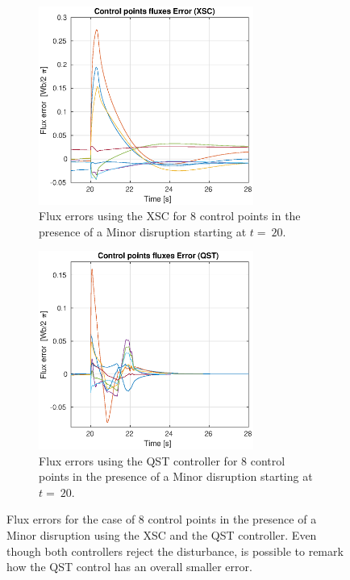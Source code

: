 \begin{figure}[h]
	\centering
	\begin{subfigure}[b]{0.4\textwidth}
		\includegraphics[trim={0cm 0cm 1.0cm 0cm},clip,height=6.50cm] {Chp3/Results_iso/8_gaps_fluxesError_mnr_dsrp.eps}  
		\caption{Flux errors using the XSC for 8 control points in the presence of a Minor disruption starting at $t=~20$.
			\label{FluxErrorXSC} }
	\end{subfigure}
	\hspace{2.2 cm }
	\begin{subfigure}[b]{0.4\textwidth}
		\includegraphics[trim={0cm 0cm 1.0cm 0cm},clip,height=6.50cm] {Chp3/Results_iso/8_gaps_fluxesError_mnr_dsrpFBC.eps}  
		\caption{ Flux errors using the QST controller for 8 control points in the presence of a Minor disruption starting  at $t=~20$.
			\label{FluxErroFBC} }
	\end{subfigure}
	
	\caption{Flux errors for the case of 8 control points in the presence of a Minor disruption using the XSC and the QST controller. Even though both controllers reject the disturbance, is possible to remark how the QST control has an overall smaller error.  }\label{FluxesError}
\end{figure}


